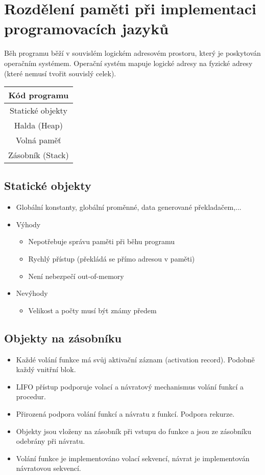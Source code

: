 \documentclass{szzclass}
\begin{document}
\section{Rozdělení paměti při implementaci programovacích jazyků}
Běh programu běží v souvislém logickém adresovém prostoru, který je poskytován operačním systémem. Operační systém mapuje logické adresy na fyzické adresy (které nemusí tvořit souvislý celek).

\begin{center}
\def\arraystretch{2}
\begin{tabular}{|c|} \hline
Kód programu \\ \hline
Statické objekty \\ \hline
Halda (Heap) \\ \hline
Volná paměť \\ \hline
Zásobník (Stack) \\ \hline
\end{tabular}
\end{center}

\subsection{Statické objekty}
\begin{itemize}
\item Globální konstanty, globální proměnné, data generované překladačem,...
\item Výhody
  \begin{itemize}
  \item Nepotřebuje správu paměti při běhu programu
  \item Rychlý přístup (překládá se přímo adresou v paměti)
  \item Není nebezpečí out-of-memory
  \end{itemize}
\item Nevýhody
  \begin{itemize}
  \item Velikost a počty musí být známy předem
  \end{itemize}
\end{itemize}

\subsection{Objekty na zásobníku}
\begin{itemize}
\item Každé volání funkce má svůj aktivační záznam (activation record). Podobně každý vnitřní blok.
\item LIFO přístup podporuje volací a návratový mechanismus volání funkcí a procedur.
\item Přirozená podpora volání funkcí a návratu z funkcí. Podpora rekurze.
\item Objekty jsou vloženy na zásobník při vstupu do funkce a jsou ze zásobníku odebrány při návratu.
\item Volání funkce je implementováno volací sekvencí, návrat je implementován návratovou sekvencí.
\end{itemize}
\end{document}
